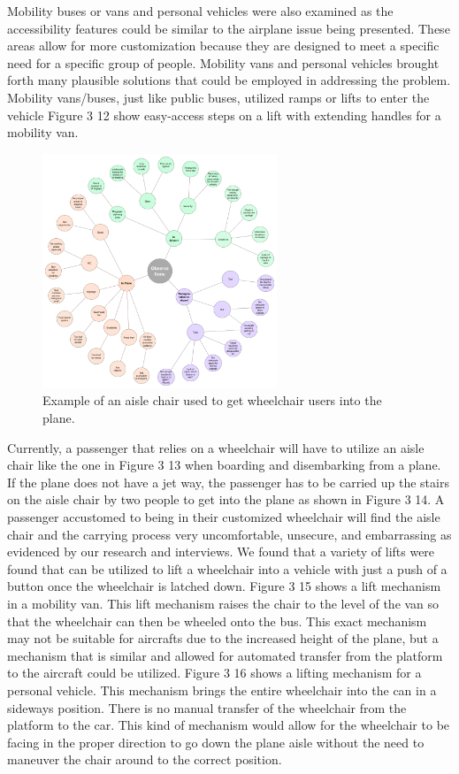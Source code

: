 Mobility buses or vans and personal vehicles were also examined as the accessibility features could be similar to the airplane issue being presented. These areas allow for more customization because they are designed to meet a specific need for a specific group of people.  Mobility vans and personal vehicles brought forth many plausible solutions that could be employed in addressing the problem.  Mobility vans/buses, just like public buses, utilized ramps or lifts to enter the vehicle Figure 3 12 show easy-access steps on a lift with extending handles for a mobility van.  

\begin{figure}[h]
  \centering
     \includegraphics[width=7cm]{images/image040}
   \caption{Example of an aisle chair used to get wheelchair users into the plane.}
  \label{fig:40}
\end{figure}

Currently, a passenger that relies on a wheelchair will have to utilize an aisle chair like the one in Figure 3 13 when boarding and disembarking from a plane.  If the plane does not have a jet way, the passenger has to be carried up the stairs on the aisle chair by two people to get into the plane as shown in Figure 3 14. A passenger accustomed to being in their customized wheelchair will find the aisle chair and the carrying process very uncomfortable, unsecure, and embarrassing as evidenced by our research and interviews. We found that a variety of lifts were found that can be utilized to lift a wheelchair into a vehicle with just a push of a button once the wheelchair is latched down. Figure 3 15 shows a lift mechanism in a mobility van.  This lift mechanism raises the chair to the level of the van so that the wheelchair can then be wheeled onto the bus. This exact mechanism may not be suitable for aircrafts due to the increased height of the plane, but a mechanism that is similar and allowed for automated transfer from the platform to the aircraft could be utilized.  Figure 3 16 shows a lifting mechanism for a personal vehicle.  This mechanism brings the entire wheelchair into the can in a sideways position.  There is no manual transfer of the wheelchair from the platform to the car.  This kind of mechanism would allow for the wheelchair to be facing in the proper direction to go down the plane aisle without the need to maneuver the chair around to the correct position.


